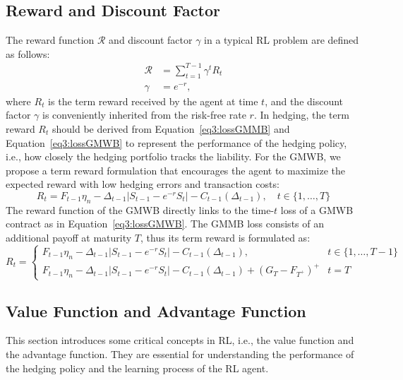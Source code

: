 \subsection{Reward and Discount Factor}
The reward function $\mathcal{R}$ and discount factor $\gamma$ in a typical RL problem are defined as follows:
\begin{align}
    \mathcal{R} & = \sum_{t=1}^{T-1} \gamma^t R_t \\
    \gamma      & = e^{-r}, \nonumber
\end{align}
where $R_t$ is the term reward received by the agent at time $t$, and the discount factor $\gamma$ is conveniently inherited from the risk-free rate $r$. 
In hedging, the term reward $R_t$ should be derived from Equation~\ref{eq3:lossGMMB} and Equation~\ref{eq3:lossGMWB} to represent the performance of the hedging policy, i.e., how closely the hedging portfolio tracks the liability.
For the GMWB, we propose a term reward formulation that encourages the agent to maximize the expected reward with low hedging errors and transaction costs:
\begin{equation} \label{eq3:rewardGMWB}
    R_t = F_{t-1}\eta_n - \Delta_{t-1} |S_{t-1} - e^{-r}S_{t}| - C_{t-1}(\Delta_{t-1}), \quad t \in \{1,\ldots,T \}
\end{equation}
The reward function of the GMWB directly links to the time-$t$ loss of a GMWB contract as in Equation~\ref{eq3:lossGMWB}.
The GMMB loss consists of an additional payoff at maturity $T$, thus its term reward is formulated as:
\begin{equation} \label{eq3:rewardGMMB}
    R_t = 
    \begin{cases}
    F_{t-1}\eta_n - \Delta_{t-1} |S_{t-1} - e^{-r}S_{t}| - C_{t-1}(\Delta_{t-1}),                         & t\in \{1,\ldots,T-1 \} \\
    F_{t-1}\eta_n - \Delta_{t-1} |S_{t-1} - e^{-r}S_{t}| - C_{t-1}(\Delta_{t-1}) + (G_T - F_{T^+})^+      & t = T
    \end{cases}
\end{equation}

\subsection{Value Function and Advantage Function}

This section introduces some critical concepts in RL, i.e., the value function and the advantage function.
They are essential for understanding the performance of the hedging policy and the learning process of the RL agent.

